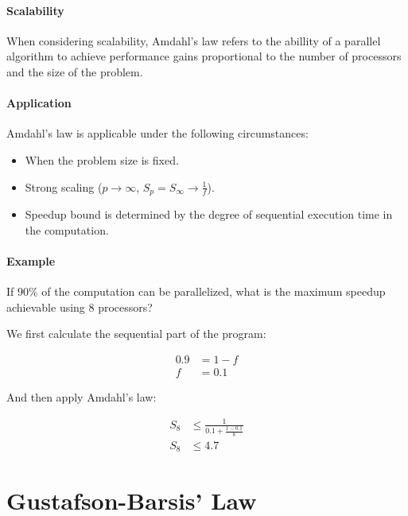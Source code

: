 \paragraph{Scalability}
When considering scalability, Amdahl's law refers to the abillity of a parallel algorithm to achieve performance gains proportional to the number of processors and the size of the problem.

\paragraph{Application}

Amdahl's law is applicable under the following circumstances:
\begin{itemize}
    \item When the problem size is fixed.
    \item Strong scaling ($p\rightarrow\infty$, $S_p = S_{\infty} \rightarrow \frac{1}{f}$).
    \item Speedup bound is determined by the degree of sequential execution time in the computation.
\end{itemize}

\paragraph{Example}

If $90\%$ of the computation can be parallelized, what is the maximum speedup achievable using 8 processors?

We first calculate the sequential part of the program:

\begin{equation*}
    \begin{split}
        0.9 & = 1 - f\\
        f & = 0.1
    \end{split}
\end{equation*}

And then apply Amdahl's law:

\begin{equation*}
    \begin{split}
        S_8 & \le \frac{1}{0.1 + \frac{1-0.1}{8}}\\
        S_8 & \le 4.7
    \end{split}
\end{equation*}

\section{Gustafson-Barsis’ Law}

